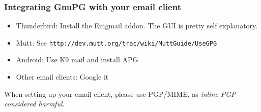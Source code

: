 \documentclass{beamer}
\begin{document}
\begin{frame}
    \frametitle{Integrating GnuPG with your email client}
    \begin{itemize}
        \item Thunderbird: Install the Enigmail addon. The GUI is pretty self
            explanatory.
        \item Mutt: See \texttt{http://dev.mutt.org/trac/wiki/MuttGuide/UseGPG}
        \item Android: Use K9 mail and install APG
        \item Other email clients: Google it
    \end{itemize}
    When setting up your email client, please use PGP/MIME, as
    \emph{inline PGP considered harmful}.
\end{frame}
\end{document}
